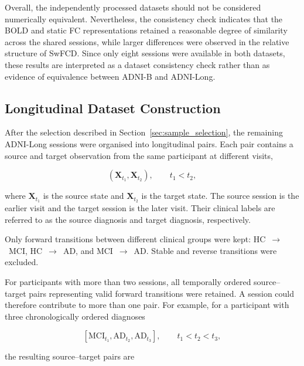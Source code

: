 Overall, the independently processed datasets should not be considered
numerically equivalent. Nevertheless, the consistency check indicates
that the BOLD and static FC representations retained a reasonable degree
of similarity across the shared sessions, while larger differences were
observed in the relative structure of SwFCD. Since only eight sessions
were available in both datasets, these results are interpreted as a
dataset consistency check rather than as evidence of equivalence between
ADNI-B and ADNI-Long.

\subsection{Longitudinal Dataset Construction}
\label{sec:longitudinal_construction}

After the selection described in Section~\ref{sec:sample_selection},
the remaining ADNI-Long sessions were organised into longitudinal
pairs. Each pair contains a source and target observation from the same
participant at different visits,

\begin{equation}
    \left(
        \mathbf{X}_{t_1},
        \mathbf{X}_{t_2}
    \right),
    \qquad t_1 < t_2,
\end{equation}

where $\mathbf{X}_{t_1}$ is the source state and
$\mathbf{X}_{t_2}$ is the target state. The source session is the
earlier visit and the target session is the later visit. Their clinical
labels are referred to as the source diagnosis and target diagnosis,
respectively.

Only forward transitions between different clinical groups were kept:
HC~$\rightarrow$~MCI, HC~$\rightarrow$~AD, and
MCI~$\rightarrow$~AD. Stable and reverse transitions were excluded.

For participants with more than two sessions, all temporally ordered
source--target pairs representing valid forward transitions were
retained. A session could therefore contribute to more than one pair.
For example, for a participant with three chronologically ordered
diagnoses

\begin{equation}
    \left[
        \mathrm{MCI}_{t_1},
        \mathrm{AD}_{t_2},
        \mathrm{AD}_{t_3}
    \right],
    \qquad t_1 < t_2 < t_3,
\end{equation}

the resulting source--target pairs are

